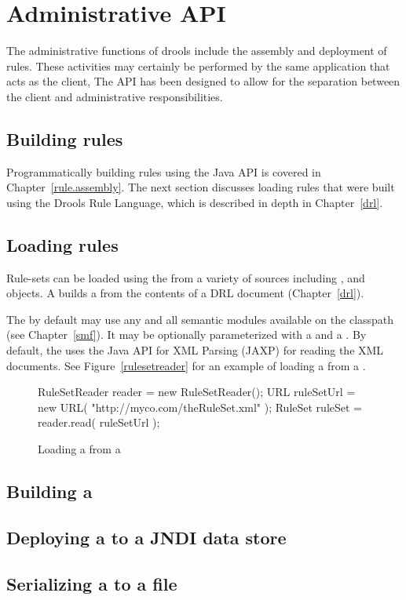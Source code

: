 \chapter{Administrative API}

The administrative functions of drools include the assembly
and deployment of rules.  These activities may certainly be
performed by the same application that acts as the client,
The API has been designed to allow for the separation between
the client and administrative responsibilities.

\section{Building rules}

Programmatically building rules using the Java API is covered
in Chapter~\vref{rule.assembly}.  The next section discusses
loading rules that were built using the Drools Rule Language,
which is described in depth in Chapter~\vref{drl}.

\section{Loading rules}
\label{admin.rules.loading}

Rule-sets can be loaded using the  from
a variety of sources including ,  and
 objects.  A  builds a
 from the contents of a DRL document (Chapter~\vref{drl}).

The  by default may use any and all semantic
modules available on the classpath (see Chapter~\vref{smf}).  It may
be optionally parameterized with a  and a
.  By default, the
 uses the Java API for XML Parsing (JAXP) 
for reading the XML documents. See Figure~\vref{rulesetreader} for an
example of loading a  from a .

\begin{figure}
\begin{javaCodelisting}
RuleSetReader reader     = new RuleSetReader();
URL           ruleSetUrl = new URL( "http://myco.com/theRuleSet.xml" );
RuleSet       ruleSet    = reader.read( ruleSetUrl );
\end{javaCodelisting}
\caption{Loading a  from a }
\label{rulesetreader}
\end{figure}

\section{Building a }

\section{Deploying a  to a JNDI data store}

\section{Serializing a  to a file}

